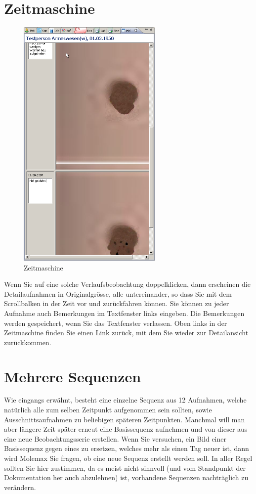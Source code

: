 \documentclass[a4paper]{scrartcl}
\begin{document}
\section{\glqq Zeitmaschine\grqq}
\begin{figure}
    \includegraphics[width=7cm]{molemax7}
    \caption{Zeitmaschine}
\end{figure}
Wenn Sie auf eine solche Verlaufsbeobachtung doppelklicken, dann erscheinen die Detailaufnahmen in Originalgrösse, alle untereinander, so dass Sie mit dem Scrollbalken in der Zeit vor und zurückfahren können. Sie können zu jeder Aufnahme auch Bemerkungen im Textfenster links eingeben. Die Bemerkungen werden gespeichert, wenn Sie das Textfenster verlassen.
Oben links in der Zeitmaschine finden Sie einen Link \glqq zurück\grqq, mit dem Sie wieder zur Detailansicht zurückkommen.

\section{Mehrere Sequenzen}
Wie eingangs erwähnt, besteht eine einzelne Sequenz aus 12 Aufnahmen, welche natürlich alle zum selben Zeitpunkt aufgenommen sein sollten, sowie Ausschnittsaufnahmen zu beliebigen späteren Zeitpunkten. Manchmal will man aber längere Zeit später erneut eine Basissequenz aufnehmen und von dieser aus eine neue Beobachtungsserie erstellen. Wenn Sie versuchen, ein Bild einer Basissequenz gegen eines zu ersetzen, welches mehr als einen Tag neuer ist, dann wird Molemax Sie fragen, ob eine neue Sequenz erstellt werden soll. In aller Regel sollten Sie hier zustimmen, da es meist nicht sinnvoll (und vom Standpunkt der Dokumentation her auch abzulehnen) ist, vorhandene Sequenzen nachträglich zu verändern.
\end{document}

